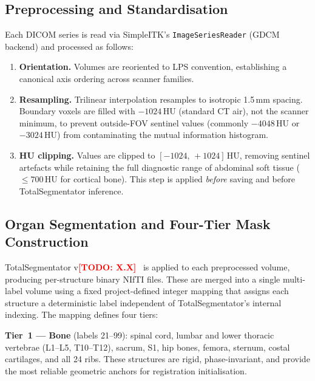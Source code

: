 \documentclass[10pt,twocolumn]{article}
\newcommand{\TODO}[1]{\textcolor{red}{\textbf{[TODO: #1]}}}
\begin{document}
\subsection{Preprocessing and Standardisation}
\label{sec:preproc}

Each DICOM series is read via SimpleITK's \texttt{ImageSeriesReader}
(GDCM backend) and processed as follows:
%
\begin{enumerate}
  \item \textbf{Orientation.}
  Volumes are reoriented to LPS convention, establishing a canonical
  axis ordering across scanner families.

  \item \textbf{Resampling.}
  Trilinear interpolation resamples to isotropic 1.5\,mm spacing.
  Boundary voxels are filled with $-1024$\,HU (standard CT air),
  not the scanner minimum, to prevent outside-FOV sentinel values
  (commonly $-4048$\,HU or $-3024$\,HU) from contaminating the
  mutual information histogram.

  \item \textbf{HU clipping.}
  Values are clipped to $[-1024,\,+1024]$\,HU, removing sentinel
  artefacts while retaining the full diagnostic range of abdominal
  soft tissue ($\leq\!700$\,HU for cortical bone).
  This step is applied \emph{before} saving and before TotalSegmentator
  inference.
\end{enumerate}

\subsection{Organ Segmentation and Four-Tier Mask Construction}
\label{sec:seg}

TotalSegmentator v\TODO{X.X}~\cite{wasserthal2023} is applied to each
preprocessed volume, producing per-structure binary NIfTI files.
These are merged into a single multi-label volume using a fixed
project-defined integer mapping that assigns each structure a
deterministic label independent of TotalSegmentator's internal
indexing.
The mapping defines four tiers:

\medskip
\noindent\textbf{Tier~1 — Bone} (labels 21--99): spinal cord, lumbar
and lower thoracic vertebrae (L1--L5, T10--T12), sacrum, S1, hip
bones, femora, sternum, costal cartilages, and all 24 ribs.
These structures are rigid, phase-invariant, and provide the most
reliable geometric anchors for registration initialisation.
\end{document}
